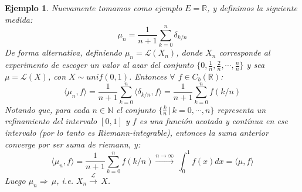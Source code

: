 \documentclass[a4paper]{article}
\newtheorem{ejemplo}{Ejemplo}
\numberwithin{equation}{subsection}
\def\R{\mathbb R}
\def\N{\mathbb N}
\begin{document}
\begin{ejemplo}
    Nuevamente tomamos como ejemplo $E=\R$, y definimos la siguiente medida:
    \[\mu_n = \frac{1}{n+1}\sum_{k=0}^{n}\delta_{k/n}\]
    De forma alternativa, definiendo $\mu_n = \mathcal{L}(X_n)$, donde $X_n$ corresponde al experimento de escoger un valor al azar del conjunto $\{0,\frac{1}{n},\frac{2}{n},\cdots,\frac{n}{n}\}$ y sea $\mu = \mathcal{L}(X)$, con $X\sim unif(0,1)$. Entonces $\forall$ $f\in C_b(\R)$:
    \[\langle \mu_n ,f\rangle = \frac{1}{n+1}\sum_{k=0}^{n} \langle \delta_{k/n},f\rangle = \frac{1}{n+1}\sum_{k=0}^{n}f(k/n)\]
    Notando que, para cada $n\in\N$ el conjunto $\{\frac{k}{n}\,|\,k=0,\cdots,n\}$ representa un refinamiento del intervalo $[0,1]$ y $f$ es una función acotada y contínua en ese intervalo (por lo tanto es \textit{Riemann-integrable}), entonces la suma anterior converge por ser suma de riemann, y:
    \[\langle \mu_n ,f\rangle = \frac{1}{n+1}\sum_{k=0}^{n}f(k/n) \xrightarrow{n\rightarrow\infty}\, \int_{0}^{1}f(x)dx = \langle \mu,f\rangle\]
    Luego $\mu_n \Rightarrow\,\mu$, i.e. $X_n \xrightarrow{\mathcal{L}}\,X$.
\end{ejemplo}
\end{document}

